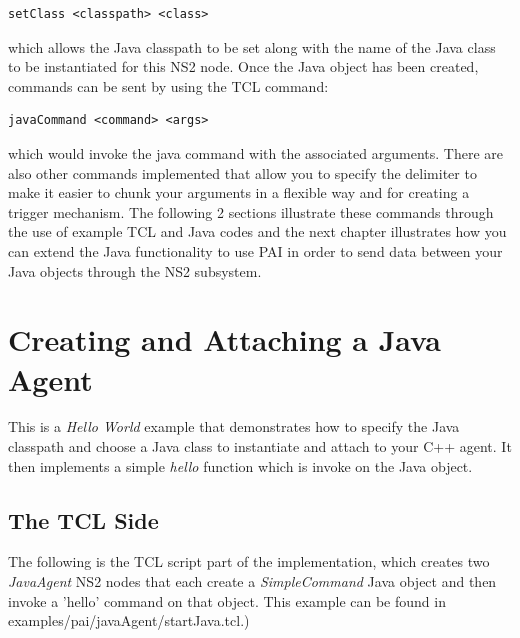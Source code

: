 \footnotesize
\begin{verbatim}
setClass <classpath> <class>
\end{verbatim}
\normalsize

\noindent which allows the Java classpath to be set along with the name of the Java class to be instantiated for this NS2 node. Once the Java object has been created,
commands can be sent by using the TCL command:

\footnotesize
\begin{verbatim}
javaCommand <command> <args>
\end{verbatim}
\normalsize

\noindent which would invoke the java command with the associated 
arguments. There are also other commands implemented that allow you to
specify the delimiter to make it easier to chunk your arguments in a
flexible way and for creating a trigger mechanism.  The following 2
sections illustrate these commands through the use of example
TCL and Java codes and the next chapter illustrates how you
can extend the Java functionality to use PAI in order to send
data between your Java objects through the NS2 subsystem.


\section{Creating and Attaching a Java Agent }
\label{jni:basic}

This is a \emph{Hello World} example that demonstrates how
to specify the Java classpath and choose a Java class to instantiate
and attach to your C++ agent. It then implements a simple \emph{hello}
function which is invoke on the Java object. 

\subsection{The TCL Side}
\label{jni:tclside}

The following is the TCL script part of the implementation, which creates two 
\emph{JavaAgent} NS2 nodes that each create a \emph{SimpleCommand} 
Java object and then invoke a 'hello' command on that object. This
example can be found in examples/pai/javaAgent/startJava.tcl.)

